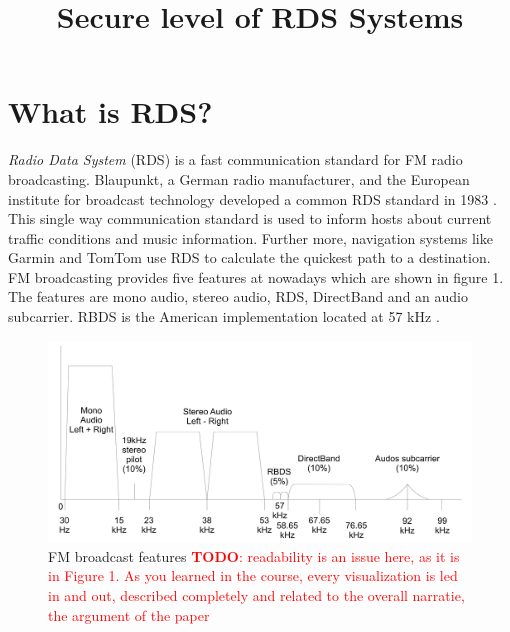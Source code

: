 \documentclass[conference,11pt,a4paper]{IEEEtran}
\newcommand{\todo}[1]{\textcolor{red}{\textbf{TODO}: #1}}
\begin{document}
	
	\title{Secure level of RDS Systems}
	\author{
	}
	\maketitle
	\thispagestyle{plain}
	\pagestyle{plain}
	
	\section{What is RDS?}
	\textit{Radio Data System} (RDS) is a fast communication standard for FM radio broadcasting. Blaupunkt, a German radio manufacturer, and the European institute for broadcast technology developed a common RDS standard in 1983 \cite{Grds}. This single way communication standard is used to inform hosts about current traffic conditions and music information. Further more, navigation systems like Garmin and TomTom use RDS to calculate the quickest path to a destination. FM broadcasting provides five features at nowadays which are shown in figure 1. The features are mono audio, stereo audio, RDS, DirectBand and an audio subcarrier. RBDS is the American implementation located at 57 kHz \cite{standard}.
	
	\begin{figure}[h]
		\centering
		\includegraphics[scale=0.13]{img/RDS_spectrum2}
		\caption{FM broadcast features \cite{standard} \todo{readability is an issue here, as it is in Figure 1. As you learned in the course, every visualization is led in and out, described completely and related to the overall narratie, the argument of the paper}}
		\label{fig: spec}
	\end{figure}
	
\end{document}
